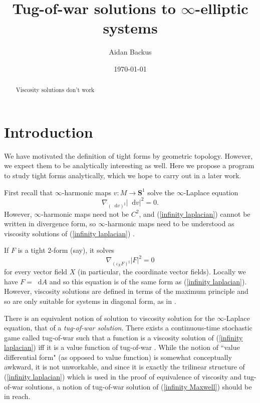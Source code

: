 \documentclass[reqno,11pt]{amsart}
\title{Tug-of-war solutions to $\infty$-elliptic systems}
\author{Aidan Backus}
\date{\today}
\newcommand{\Sph}{\mathbf S}
\newcommand*\dif{\mathop{}\!\mathrm{d}}
\newcommand{\dfn}[1]{\emph{#1}\index{#1}}
\theoremstyle{definition}
\numberwithin{equation}{section}
\begin{document}
\begin{abstract}
Viscosity solutions don't work
\end{abstract}

\maketitle

\section{Introduction}
We have motivated the definition of tight forms by geometric topology.
However, we expect them to be analytically interesting as well.
Here we propose a program to study tight forms analytically, which we hope to carry out in a later work.

First recall that $\infty$-harmonic maps $v: M \to \Sph^1$ solve the $\infty$-Laplace equation 
\begin{equation}\label{infinity laplacian}
\nabla_{(\dif v)^\sharp} |\dif v|^2 = 0.
\end{equation}
However, $\infty$-harmonic maps need not be $C^2$, and (\ref{infinity laplacian}) cannot be written in divergence form, so $\infty$-harmonic maps need to be understood as viscosity solutions of (\ref{infinity laplacian}) \cite{Crandall2008}.

If $F$ is a tight $2$-form (say), it solves 
$$\nabla_{(\iota_X F)^\sharp} |F|^2 = 0$$
for every vector field $X$ (in particular, the coordinate vector fields).
Locally we have $F = \dif A$ and so this equation is of the same form as (\ref{infinity laplacian}).
However, viscosity solutions are defined in terms of the maximum principle and so are only suitable for systems in diagonal form, as in \cite{Ishii92}.

There is an equivalent notion of solution to viscosity solution for the $\infty$-Laplace equation, that of a \dfn{tug-of-war solution}.
There exists a continuous-time stochastic game called tug-of-war such that a function is a viscosity solution of (\ref{infinity laplacian}) iff it is a value function of tug-of-war \cite{Peres_2008}.
While the notion of ``value differential form" (as opposed to value function) is somewhat conceptually awkward, it is not unworkable, and since it is exactly the trilinear structure of (\ref{infinity laplacian}) which is used in the proof of equivalence of viscosity and tug-of-war solutions, a notion of tug-of-war solution of (\ref{infinity Maxwell}) should be in reach.
\end{document}
